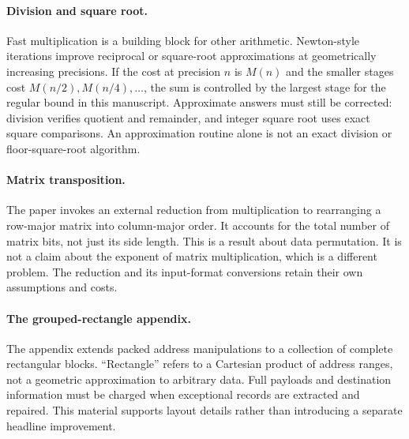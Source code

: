
\paragraph{Division and square root.}
Fast multiplication is a building block for other arithmetic. Newton-style
iterations improve reciprocal or square-root approximations at geometrically
increasing precisions. If the cost at precision $n$ is $M(n)$ and the smaller
stages cost $M(n/2),M(n/4),\ldots$, the sum is controlled by the largest stage
for the regular bound in this manuscript. Approximate answers must still be
corrected: division verifies quotient and remainder, and integer square root
uses exact square comparisons. An approximation routine alone is not an exact
division or floor-square-root algorithm.

\paragraph{Matrix transposition.}
The paper invokes an external reduction from multiplication to rearranging a
row-major matrix into column-major order. It accounts for the total number of
matrix bits, not just its side length. This is a result about data permutation.
It is not a claim about the exponent of matrix multiplication, which is a
different problem. The reduction and its input-format conversions retain their
own assumptions and costs.

\paragraph{The grouped-rectangle appendix.}
The appendix extends packed address manipulations to a collection of complete
rectangular blocks. ``Rectangle'' refers to a Cartesian product of address
ranges, not a geometric approximation to arbitrary data. Full payloads and
destination information must be charged when exceptional records are extracted
and repaired. This material supports layout details rather than introducing a
separate headline improvement.


